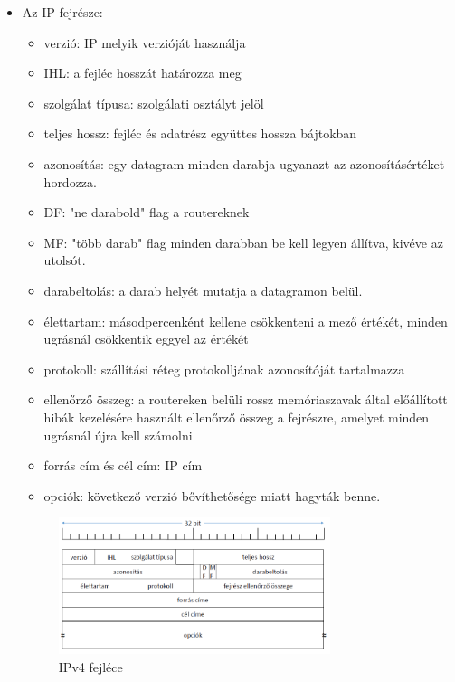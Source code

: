 \documentclass[12pt]{article}
\begin{document}
    \begin{itemize}[leftmargin=7.5mm]
        \renewcommand{\labelitemi}{$\vcenter{\hbox{\tiny$\bullet$}}$}
        \item Az IP fejrésze:
    	\begin{itemize}
            \item verzió: IP melyik verzióját használja
            \item IHL: a fejléc hosszát határozza meg
            \item szolgálat típusa: szolgálati osztályt jelöl
            \item teljes hossz: fejléc és adatrész együttes hossza bájtokban
            \item azonosítás: egy datagram minden darabja ugyanazt az azonosításértéket hordozza.
            \item DF: "ne darabold" flag a routereknek
            \item MF: "több darab" flag minden darabban be kell legyen állítva, kivéve az utolsót.
            \item darabeltolás: a darab helyét mutatja a datagramon belül.
            \item élettartam: másodpercenként kellene csökkenteni a mező értékét, minden ugrásnál csökkentik eggyel az értékét
            \item protokoll: szállítási réteg protokolljának azonosítóját tartalmazza
            \item ellenőrző összeg: a routereken belüli rossz memóriaszavak által előállított hibák kezelésére használt ellenőrző összeg a fejrészre, amelyet minden ugrásnál újra kell számolni
            \item forrás cím és cél cím: IP cím
            \item opciók: következő verzió bővíthetősége miatt hagyták benne.
    	\end{itemize}
    	
    	\begin{figure}[H]
            \centering
            \includegraphics[width=0.75\textwidth]{img/ip_fejresz.png}
            \caption{IPv4 fejléce}
    	\end{figure}
    	

\end{itemize}
\end{document}
